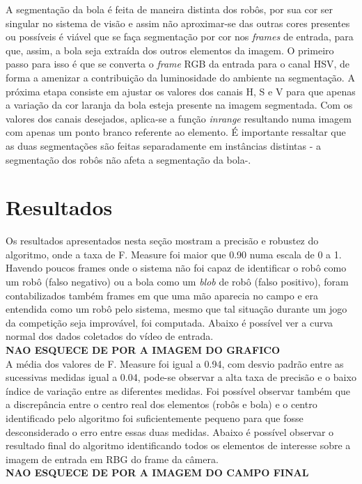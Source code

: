 \documentclass[conference, harvard, brazil, english]{sbatex}
\begin{document}
		\par A segmentação da bola é feita de maneira distinta dos robôs, por sua cor ser singular no sistema de visão e assim não aproximar-se das outras cores presentes ou possíveis é viável que se faça segmentação por cor nos \textit{frames} de entrada, para que, assim, a bola seja extraída dos outros elementos da imagem. O primeiro passo para isso é que se converta o \textit{frame} RGB da entrada para o canal HSV, de forma a amenizar a contribuição da luminosidade do ambiente na segmentação. A próxima etapa consiste em ajustar os valores dos canais H, S e V para que apenas a variação da cor laranja da bola esteja presente na imagem segmentada. Com os valores dos canais desejados, aplica-se a função \textit{inrange} resultando numa imagem com apenas um ponto branco referente ao elemento. É importante ressaltar que as duas segmentações são feitas separadamente em instâncias distintas - a segmentação dos robôs não afeta a segmentação da bola-.
	\section{Resultados}
		Os resultados apresentados nesta seção mostram a precisão e robustez do algoritmo, onde a taxa de F. Measure foi maior que 0.90 numa escala de 0 a 1. Havendo poucos frames onde o sistema não foi capaz de identificar o robô como um robô (falso negativo) ou a bola como um \textit{blob} de robô (falso positivo), foram contabilizados também frames em que uma mão aparecia no campo e era entendida como um robô pelo sistema, mesmo que tal situação durante um jogo da competição seja improvável, foi computada. Abaixo é possível ver a curva normal dos dados coletados do vídeo de entrada.\\
		\textbf{NAO ESQUECE DE POR A IMAGEM DO GRAFICO}\\
		A média dos valores de F. Measure foi igual a 0.94, com desvio padrão entre as sucessivas medidas igual a 0.04, pode-se observar a alta taxa de precisão e o baixo índice de variação entre as diferentes medidas.
		Foi possível observar também que a discrepância entre o centro real dos elementos (robôs e bola) e o centro identificado pelo algoritmo foi suficientemente pequeno para que fosse desconsiderado o erro entre essas duas medidas. Abaixo é possível observar o resultado final do algoritmo identificando todos os elementos de interesse sobre a imagem de entrada em RBG do frame da câmera.\\
		\textbf{NAO ESQUECE DE POR A IMAGEM DO CAMPO FINAL}\\
		
\end{document}
